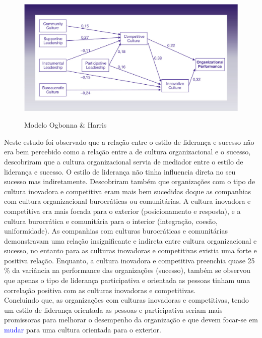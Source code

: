 {\begin{figure}[H]
\centering
\includegraphics[scale=.35]{"./image/OB/Ogbonna & Harris.jpg"}\\
\caption{Modelo Ogbonna \& Harris}
\label{Modelo}
\end{figure}\par
Neste estudo foi observado que a relação entre o estilo de liderança e sucesso não era bem percebido como a relação entre a de cultura organizacional e o sucesso, descobriram que a cultura organizacional servia de mediador entre o estilo de liderança e sucesso. O estilo de liderança não tinha influencia direta no seu sucesso mas indiretamente. Descobriram também que organizações com o tipo de cultura inovadora e competitiva eram mais bem sucedidas doque as companhias com cultura organizacional burocráticas ou comunitárias. A cultura inovadora e competitiva era mais focada para o exterior (posicionamento e resposta), e a cultura burocrática e comunitária para o interior (integração, coesão, uniformidade). As companhias com culturas burocráticas e comunitárias demonstravam uma relação insignificante e indireta entre cultura organizacional e sucesso, no entanto para as culturas inovadoras e competitivas existia uma forte e positiva relação. Enquanto, a cultura inovadora e competitiva preenchia quase 25 \% da variância na performance das organizações (sucesso), também se observou que apenas o tipo de liderança participativa e orientada as pessoas tinham uma correlação positiva com as culturas inovadoras e competitivas.\\
Concluindo que, as organizações com culturas inovadoras e competitivas, tendo um estilo de liderança orientada as pessoas e participativa seriam mais promissoras para melhorar o desempenho da organização e que devem focar-se em \textcolor{blue}{mudar} para uma cultura orientada para o exterior. \\




}
